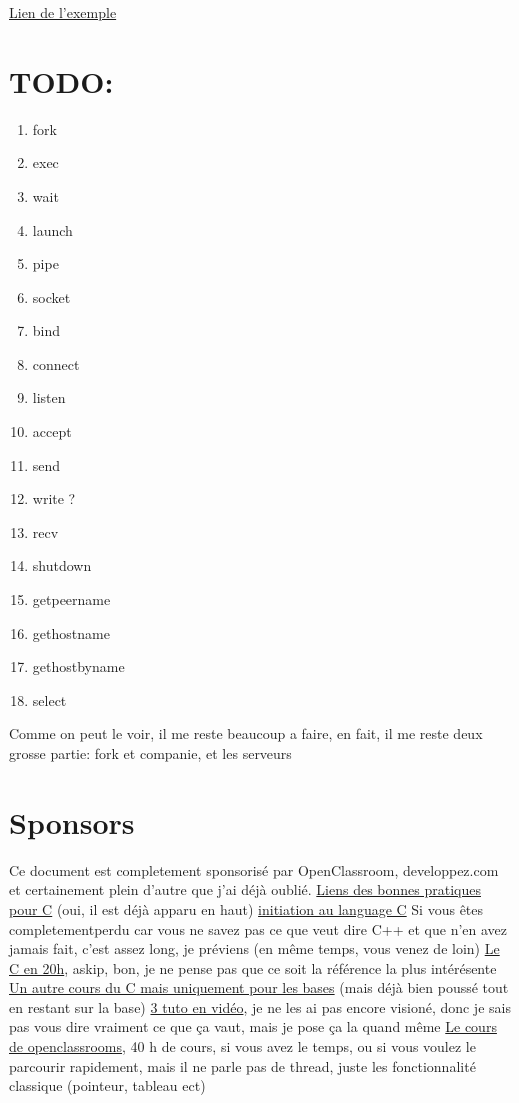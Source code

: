 \documentclass[a4paper]{article}
\begin{document}
\href{https://openclassrooms.com/courses/la-programmation-systeme-en-c-sous-unix/les-threads-3#/id/r-1515355}{Lien de l'exemple}
\section{TODO:}
\begin{enumerate}
  \item fork
  \item exec
  \item wait
  \item launch
  \item pipe
  \item socket
  \item bind
  \item connect
  \item listen
  \item accept
  \item send
  \item write ?
  \item recv
  \item shutdown
  \item getpeername
  \item gethostname
  \item gethostbyname
  \item select
\end{enumerate}
Comme on peut le voir, il me reste beaucoup a faire, en fait, il me reste deux grosse partie: fork et companie, et les serveurs

\section{Sponsors}
Ce document est completement sponsorisé par OpenClassroom, developpez.com et certainement plein d'autre que j'ai déjà oublié.\newline
\href{http://emmanuel-delahaye.developpez.com/tutoriels/c/bonnes-pratiques-codage-c/#LI-A}{Liens des bonnes pratiques pour C} (oui, il est déjà apparu en haut)\newline
\href{http://melem.developpez.com/tutoriels/langage-c/initiation-langage-c/}{initiation au language C} Si vous êtes completementperdu car vous ne savez pas ce que veut dire C++ et que n'en avez jamais fait, c'est assez long, je préviens (en même temps, vous venez de loin)\newline
\href{https://c.developpez.com/cours/20-heures/}{Le C en 20h}, askip, bon, je ne pense pas que ce soit la référence la plus intérésente\newline
\href{https://c.developpez.com/cours/poly-c/?page=page_1}{Un autre cours du C mais uniquement pour les bases} (mais déjà bien poussé tout en restant sur la base)\newline
\href{https://fr.tuto.com/langage-c/}{3 tuto en vidéo}, je ne les ai pas encore visioné, donc je sais pas vous dire vraiment ce que ça vaut, mais je pose ça la quand même\newline
\href{https://openclassrooms.com/courses/apprenez-a-programmer-en-c}{Le cours de openclassrooms}, 40 h de cours, si vous avez le temps, ou si vous voulez le parcourir rapidement, mais il ne parle pas de thread, juste les fonctionnalité classique (pointeur, tableau ect)
\end{document}
